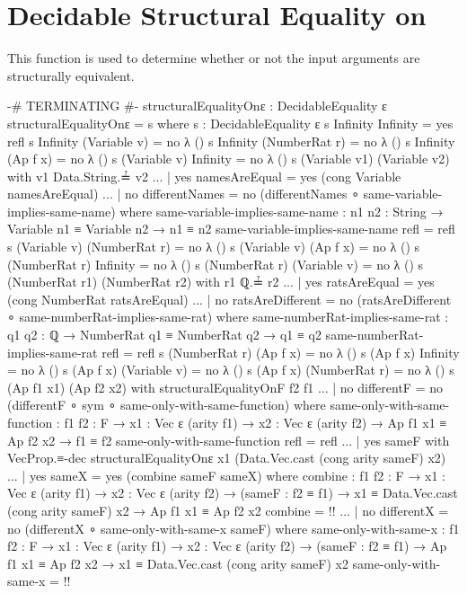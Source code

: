 \documentclass{report}
\begin{document}
\section{Decidable Structural Equality on }
This function is used to determine whether or not the input arguments are structurally equivalent.

\begin{code}
  {-# TERMINATING #-}
  structuralEqualityOnε : DecidableEquality ε
  structuralEqualityOnε = s
    where
    s : DecidableEquality ε
    s Infinity Infinity = yes refl
    s Infinity (Variable v) = no λ ()
    s Infinity (NumberRat r) = no λ ()
    s Infinity (Ap f x) = no λ ()
    s (Variable v) Infinity = no λ ()
    s (Variable v1) (Variable v2) with v1 Data.String.≟ v2
    ... | yes namesAreEqual = yes (cong Variable namesAreEqual)
    ... | no differentNames = no (differentNames ∘ same-variable-implies-same-name)
      where
      same-variable-implies-same-name :
        {n1 n2 : String} →
        Variable n1 ≡ Variable n2 →
        n1 ≡ n2
      same-variable-implies-same-name refl = refl
    s (Variable v) (NumberRat r) = no λ ()
    s (Variable v) (Ap f x) = no λ ()
    s (NumberRat r) Infinity = no λ ()
    s (NumberRat r) (Variable v) = no λ ()
    s (NumberRat r1) (NumberRat r2) with r1 ℚ.≟ r2
    ... | yes ratsAreEqual = yes (cong NumberRat ratsAreEqual)
    ... | no ratsAreDifferent = no (ratsAreDifferent ∘ same-numberRat-implies-same-rat)
      where
      same-numberRat-implies-same-rat :
        {q1 q2 : ℚ} →
        NumberRat q1 ≡ NumberRat q2 →
        q1 ≡ q2
      same-numberRat-implies-same-rat refl = refl
    s (NumberRat r) (Ap f x) = no λ ()
    s (Ap f x) Infinity = no λ ()
    s (Ap f x) (Variable v) = no λ ()
    s (Ap f x) (NumberRat r) = no λ ()
    s (Ap f1 x1) (Ap f2 x2) with structuralEqualityOnF f2 f1
    ... | no differentF = no (differentF ∘ sym ∘ same-only-with-same-function)
      where
      same-only-with-same-function :
        {f1 f2 : F} →
        {x1 : Vec ε (arity f1)} →
        {x2 : Vec ε (arity f2)} →
        Ap f1 x1 ≡ Ap f2 x2 →
        f1 ≡ f2
      same-only-with-same-function refl = refl
    ... | yes sameF with VecProp.≡-dec structuralEqualityOnε
                                       x1 (Data.Vec.cast (cong arity sameF) x2)
    ... | yes sameX = yes (combine sameF sameX)
      where
      combine :
        {f1 f2 : F} →
        {x1 : Vec ε (arity f1)} →
        {x2 : Vec ε (arity f2)} →
        (sameF : f2 ≡ f1) →
        x1 ≡ Data.Vec.cast (cong arity sameF) x2 →
        Ap f1 x1 ≡ Ap f2 x2
      combine = {!!}
    ... | no differentX = no (differentX ∘ same-only-with-same-x sameF)
      where
      same-only-with-same-x :
        {f1 f2 : F} →
        {x1 : Vec ε (arity f1)} →
        {x2 : Vec ε (arity f2)} →
        (sameF : f2 ≡ f1) →
        Ap f1 x1 ≡ Ap f2 x2 →
        x1 ≡ Data.Vec.cast (cong arity sameF) x2
      same-only-with-same-x = {!!}
\end{code}
\end{document}
